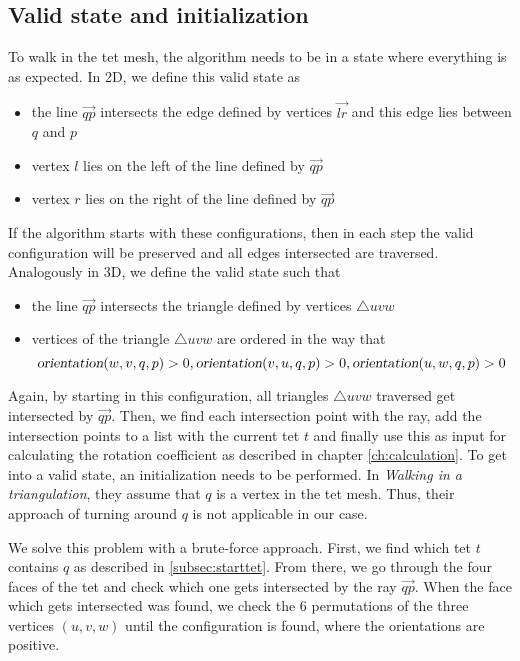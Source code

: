 \documentclass[../thesis.tex]{subfiles}
\begin{document}
\subsection{Valid state and initialization}\label{subsec:validstate}
To walk in the tet mesh, the algorithm needs to be in a state where everything is as expected.
In 2D, we define this valid state as
\begin{itemize}
  \item the line $\Vec{qp}$ intersects the edge defined by vertices $\Vec{lr}$ and this edge lies between $q$ and $p$
  \item vertex $l$ lies on the left of the line defined by $\Vec{qp}$
  \item vertex $r$ lies on the right of the line defined by $\Vec{qp}$
\end{itemize}
If the algorithm starts with these configurations, then in each step
the valid configuration will be preserved and all edges intersected are
traversed. 
Analogously in 3D, we define the valid state such that
\begin{itemize}
  \item the line $\Vec{qp}$ intersects the triangle defined by vertices $\triangle uvw$
  \item vertices of the triangle $\triangle uvw$ are ordered in the way that
  $$\textsl{orientation}(w,v,q,p)>0, \textsl{orientation}(v,u,q,p)>0, \textsl{orientation}(u,w,q,p)>0$$
\end{itemize}
Again, by starting in this configuration, all triangles $\triangle uvw$
traversed get intersected by $\Vec{qp}$. Then, we find each
intersection point with the ray, add the intersection points to a list
with the current tet $t$ and finally use this as input for
calculating the rotation coefficient as described in chapter \ref{ch:calculation}.
To get into a valid state, an initialization needs to be performed.
In \emph{Walking in a triangulation}\cite{Devillers}, they assume that
$q$ is a vertex in the tet mesh. Thus, their approach of turning around $q$
is not applicable in our case.

We solve this problem with a brute-force approach.
First, we find which tet $t$ contains $q$ as described in \ref{subsec:starttet}.
From there, we go through the four faces of the tet and check which
one gets intersected by the ray $\Vec{qp}$.
When the face which gets intersected was found,
we check the 6 permutations of the three vertices $(u,v,w)$
until the configuration is found, where the orientations are positive.
\end{document}
